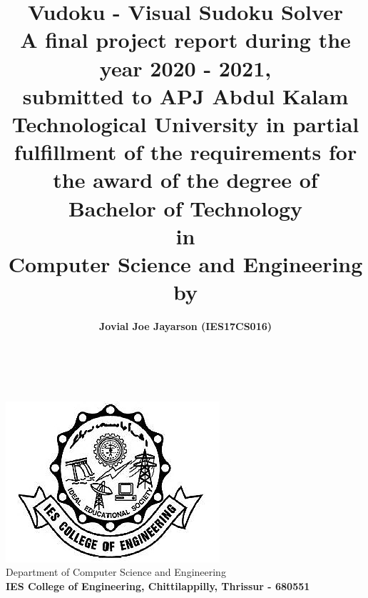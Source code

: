 \documentclass[12pt, a4paper]{report}
\title{\textbf{Vudoku - Visual Sudoku Solver} \\ \vspace{1cm} \large A final project report during the year 2020 - 2021, \\ submitted to APJ Abdul Kalam Technological University in partial fulfillment of the requirements for the award of the degree of \\ \vspace{0.5cm} \large \textbf{Bachelor of Technology \\ in \\ Computer Science and Engineering} \\ \vspace{0.5cm} \large by}
\author{\textbf{Jovial Joe Jayarson (IES17CS016)}}
\date{}
\begin{document}

\makeatletter
\thispagestyle{empty}
\begin{titlepage}
    \begin{center}
        \vspace*{\fill}
        {\huge \@title }\\[0.5cm]
        {\@author} \\[0.5cm]
        \includegraphics[width=0.5\linewidth]{iesce.png}\\[10ex]
        {\large Department of Computer Science and Engineering \\ \textbf{IES College of Engineering, Chittilappilly, Thrissur - 680551}}
        \vspace*{\fill}
    \end{center}
\end{titlepage}

\end{document}
